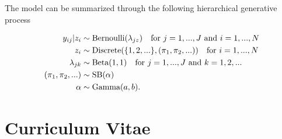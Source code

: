 \documentclass[
  12pt,
]{article}
\begin{document}
The model can be summarized through the following hierarchical
generative process

\begin{align} 
\nonumber y_{ij}|z_i & \sim \text{Bernoulli}(\lambda_{jz}) \hspace{10px} \text{for } j=1,...,J \text{ and } i=1,...,N\\  \nonumber
z_i & \sim \text{Discrete}(\{1,2,...\},(\pi_1,\pi_2,...)) \hspace{10px} \text{for } i=1,...,N \\ \nonumber
\lambda_{jk} & \sim \text{Beta}(1,1) \hspace{10px} \text{for } j=1,...,J \text{ and } k=1,2,... \\ \nonumber
(\pi_1,\pi_2,...) & \sim \text{SB}(\alpha) \\ 
\alpha & \sim \text{Gamma}(a,b).
\end{align}

\newpage

\renewcommand{\bibname}{References}


\newpage

\pagestyle{empty}
\section*{Curriculum Vitae}\label{curriculumvitae}
\end{document}
